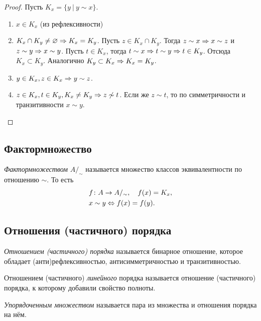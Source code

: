 \begin{proof}
	Пусть $K_x = \{y\ |\ y \sim x\}$.
	
	\begin{enumerate}
		\item $x \in K_x$ (из рефлексивности)
		\item $K_x \cap K_y \neq \varnothing \Rightarrow K_x = K_y$. Пусть $z \in K_x \cap K_y$. Тогда $z \sim x \Rightarrow x \sim z$ и $z \sim y \Rightarrow x \sim y$. Пусть $t \in K_x$, тогда $t \sim x \Rightarrow t \sim y \Rightarrow t \in K_y$. Отсюда $K_x \subset K_y$. Аналогично $K_y \subset K_x \Rightarrow K_x = K_y$.
		\item $y \in K_x, z \in K_x \Rightarrow y \sim z$.
		\item $z \in K_x, t \in K_y, K_x \neq K_y \Rightarrow z \not\sim t$. Если же $z \sim t$, то по симметричности и транзитивности $x \sim y$.
	\end{enumerate}
\end{proof}

\subsection{Фактормножество}

\begin{definition}
	\textit{Фактормножеством} $A/_\sim$ называется множество классов эквивалентности по отношению $\sim$. То есть
	\begin{align*}
		&f \colon  A \rightarrow A/_\sim, \quad f(x) = K_x,
		\\
		&x \sim y \Leftrightarrow f(x) = f(y).
	\end{align*}
\end{definition}

\subsection{Отношения (частичного) порядка}

\begin{definition}
	\textit{Отношением (частичного) порядка} называется бинарное отношение, которое обладает (анти)рефлексивностью, антисимметричностью и транзитивностью.
\end{definition}

\begin{definition}
	Отношением (частичного) \textit{линейного} порядка называется отношение (частичного) порядка, к которому добавили свойство полноты.
\end{definition}

\begin{definition}
	\textit{Упорядоченным множеством} называется пара из множества и отношения порядка на нём.
\end{definition}

